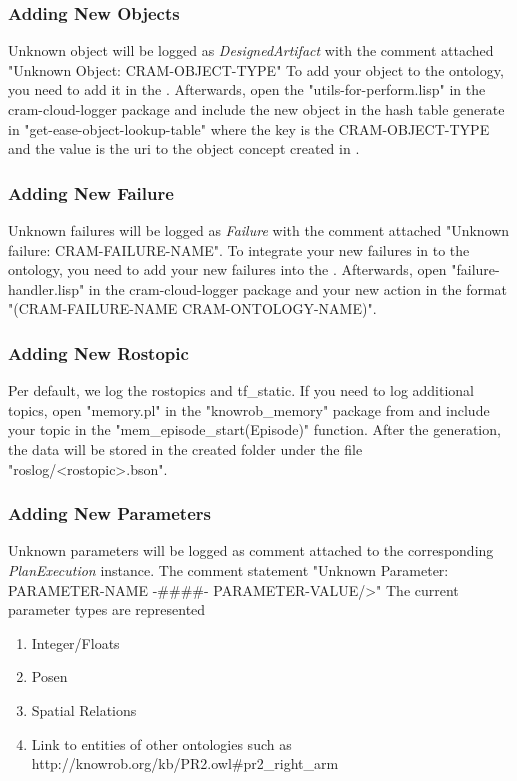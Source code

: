 \subsubsection{Adding New Objects}
Unknown object will be logged as \textit{DesignedArtifact} with the comment attached "Unknown Object: CRAM-OBJECT-TYPE"
To add your object to the ontology, you need to add it in the \easeObj.
Afterwards, open the "utils-for-perform.lisp" in the 
cram-cloud-logger package and include the new object in the hash table generate in "get-ease-object-lookup-table" where the key is the CRAM-OBJECT-TYPE and the value is the uri to the object concept created in \easeObj.

\subsubsection{Adding New Failure}
Unknown failures will be logged as \textit{Failure} with the comment attached "Unknown failure: CRAM-FAILURE-NAME".
To integrate your new \cram failures in to the ontology, you need to add your new failures into the \cramOwl.
Afterwards, open "failure-handler.lisp" in the cram-cloud-logger package and your new action in the format "(CRAM-FAILURE-NAME CRAM-ONTOLOGY-NAME)".	

\subsubsection{Adding New Rostopic}
Per default, we log the rostopics \tf and tf\_static.
If you need to log additional topics, open "memory.pl" in the "knowrob\_memory" package from \knowrob and include your topic in the "mem\_episode\_start(Episode)" function.
After the \neem generation, the data will be stored in the created \neem folder under the file "roslog/<rostopic>.bson".

\subsubsection{Adding New Parameters}
Unknown parameters will be logged as comment attached to the corresponding \textit{PlanExecution} instance.
The comment statement "Unknown Parameter: PARAMETER-NAME  -\#\#\#\#- PARAMETER-VALUE/>"
The current parameter types are represented 


\begin{enumerate} 
	\item Integer/Floats
	\item Posen
	\item Spatial Relations
	\item Link to entities of other ontologies such as http://knowrob.org/kb/PR2.owl\#pr2\_right\_arm
\end{enumerate}

